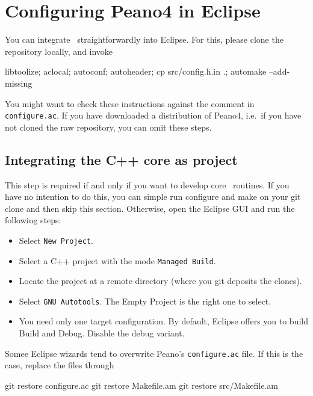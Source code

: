 \chapter{Configuring Peano4 in Eclipse}


You can integrate \Peano\ straightforwardly into Eclipse. For this, please clone
the repository locally, and invoke

\begin{code}
libtoolize; aclocal; 
autoconf; autoheader; 
cp src/config.h.in .; 
automake --add-missing
\end{code}

\noindent
You might want to check these instructions against the comment in
\texttt{configure.ac}. If you have downloaded a distribution of Peano4,
i.e.~if you have not cloned the raw repository, you can omit these steps.


\section{Integrating the C++ core as project}

This step is required if and only if you want to develop core \Peano\ routines.
If you have no intention to do this, you can simple run configure and make on
your git clone and then skip this section. 
Otherwise, open the Eclipse GUI and run the following steps:

\begin{itemize}
  \item Select \texttt{New Project}.
  \item Select a C++ project with the mode \texttt{Managed Build}.
  \item Locate the project at a remote directory (where you git deposits the
  clones).
  \item Select \texttt{GNU Autotools}. The Empty Project is the right one to select.
  \item You need only one target configuration. By default, Eclipse offers you to build Build and Debug. Disable the debug variant.  
\end{itemize}

\noindent
Somee Eclipse wizards tend to overwrite Peano's \texttt{configure.ac} file. If
this is the case, replace the files through

\begin{code}
git restore  configure.ac
git restore  Makefile.am
git restore  src/Makefile.am
\end{code}

